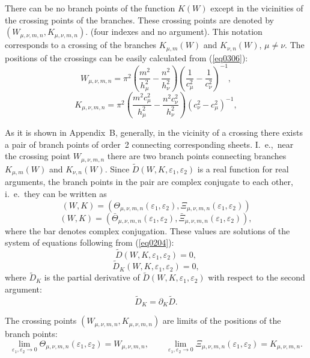 \documentclass[12pt]{article}
\newcommand{\ptl}{\partial}
\newcommand{\eps}{\varepsilon}
\begin{document}
There can be no branch points of the function $K(W)$ except in the vicinities of
the crossing points of the branches. These crossing points are denoted by 
$(W_{\mu, \nu , m,n} , K_{\mu, \nu, m,n})$.
(four indexes and no argument).
This notation corresponds to a crossing of the branches $K_{\mu , m}(W)$ and $K_{\nu ,n}(W)$, 
$\mu \ne \nu$. The positions of the crossings can be easily calculated from 
(\ref{eq0306}):
\begin{equation}
W_{\mu,\nu , m,n} = \pi^2 
\left( \frac{m^2}{h_{\mu}^2} - \frac{n^2}{h_{\nu}^2} \right) 
\left( \frac{1}{c_{\mu}^2} - \frac{1}{c_\nu^2} \right)^{-1},
\label{eq0307}
\end{equation}
\begin{equation}
K_{\mu,\nu , m,n} = \pi^2 
\left( \frac{m^2 c_{\mu}^2}{h_{\mu}^2} - \frac{n^2 c_{\nu}^2}{h_{\nu}^2} \right) 
\left( c_{\nu}^2 - c_\mu^2 \right)^{-1},
\label{eq0308}
\end{equation}

As it is shown in Appendix~B, generally, in the vicinity of a crossing there exists 
a pair of branch points of order~2 connecting corresponding sheets. I.~e.,\ near the 
crossing point $W_{\mu,\nu , m,n}$ there are two branch points 
connecting branches $K_{\mu , m}(W)$ and $K_{\nu , n}(W)$. 
Since $\tilde D(W,K,\eps_1,\eps_2)$ is a real function for real arguments, the branch points in the pair are complex conjugate to each other, i.~e.\ they can be written as 
\[
(W , K) = (\Theta_{\mu,\nu , m,n} (\eps_1 , \eps_2), 
\Xi_{\mu,\nu , m,n}(\eps_1 , \eps_2))
\]
\[
(W , K) = (\bar \Theta_{\mu,\nu,m,n} (\eps_1 , \eps_2),
\bar \Xi_{\mu,\nu,m,n} (\eps_1 , \eps_2)),
\]
where the bar denotes complex conjugation.  
These values are solutions of the system of equations following from (\ref{eq0204}):
\begin{equation}
\tilde D (W,K, \eps_1 , \eps_2)  = 0 , 
\label{eq0310}
\end{equation}
\begin{equation}
\tilde D_K (W,K, \eps_1 , \eps_2)  = 0 , 
\label{eq0311}
\end{equation}
where $\tilde D_K$ is the partial derivative of $\tilde D(W,K,\eps_1 , \eps_2)$ 
with respect to the second argument:
\[
\tilde D_K = \ptl_K \tilde D. 
\]

The crossing points $(W_{\mu,\nu,m,n} , K_{\mu,\nu,m,n})$ are limits of the positions
of the branch points:
\[
\lim_{\eps_1 , \eps_2 \to 0}
\Theta_{\mu,\nu,m,n} (\eps_1 , \eps_2)  = W_{\mu,\nu , m,n},
\qquad
\lim_{\eps_1 , \eps_2 \to 0}
\Xi_{\mu,\nu , m,n} (\eps_1 , \eps_2)  = K_{\mu,\nu, m,n}.
\] 
\end{document}
